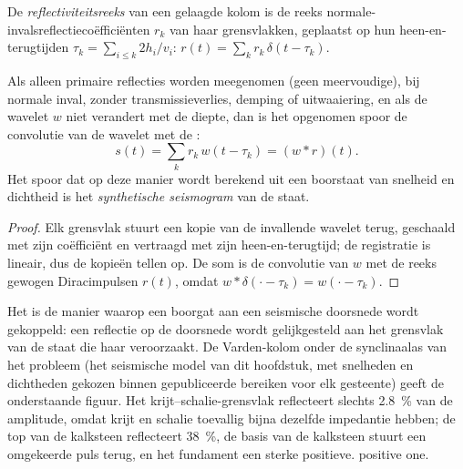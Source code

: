 \begin{definition}[Reflectiviteitsreeks]\label{def:b3:exploration-seismology:synthetic}
De \emph{reflectiviteitsreeks} van een gelaagde kolom is
de reeks normale-invalsreflectiecoëfficiënten $r_k$ van haar grensvlakken, geplaatst op
hun heen-en-terugtijden $\tau_k = \sum_{i \le k} 2h_i/v_i$:
$r(t) = \sum_k r_k\,\delta(t - \tau_k)$.
\end{definition}

\begin{proposition}\label{prop:b3:exploration-seismology:synthetic}
Als alleen primaire reflecties worden meegenomen (geen meervoudige), bij normale inval,
zonder transmissieverlies, demping of uitwaaiering, en als de wavelet $w$ niet
verandert met de diepte, dan is het opgenomen spoor de convolutie van de wavelet met de
:
\[
  s(t) = \sum_k r_k\,w(t - \tau_k) = (w*r)(t) .
\]
Het spoor dat op deze manier wordt berekend uit een boorstaat van snelheid en dichtheid is het
\emph{synthetische seismogram} van de staat.
\end{proposition}

\begin{proof}
Elk grensvlak stuurt een kopie van de invallende wavelet terug, geschaald met zijn
coëfficiënt en vertraagd met zijn heen-en-terugtijd; de registratie is lineair, dus de
kopieën tellen op. De som is de convolutie van $w$ met de reeks gewogen Diracimpulsen
$r(t)$, omdat $w*\delta(\cdot - \tau_k) = w(\cdot - \tau_k)$.
\end{proof}

Het  is de manier waarop een boorgat aan een seismische doorsnede
wordt gekoppeld: een reflectie op de doorsnede wordt gelijkgesteld aan het grensvlak van de
staat die haar veroorzaakt. De Varden-kolom onder de synclinaalas van het probleem (het
seismische model van dit hoofdstuk, met snelheden en dichtheden gekozen binnen gepubliceerde
bereiken voor elk gesteente)
geeft de onderstaande figuur. Het krijt--schalie-grensvlak reflecteert slechts
\qty{2.8}{\percent} van de amplitude, omdat krijt en schalie toevallig bijna dezelfde
impedantie hebben; de top van de kalksteen reflecteert \qty{38}{\percent}, de basis van de
kalksteen stuurt een omgekeerde puls terug, en het fundament een sterke positieve.
positive one.

